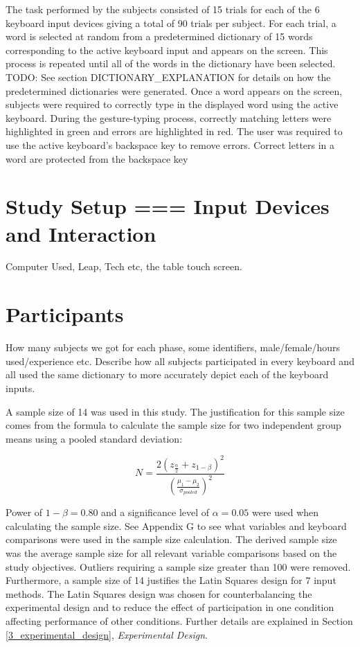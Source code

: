 The task performed by the subjects consisted of 15 trials for each of the 6 keyboard input devices giving a total of 90 trials per subject. For each trial, a word is selected at random from a predetermined dictionary of 15 words corresponding to the active keyboard input and appears on the screen. This process is repeated until all of the words in the dictionary have been selected. TODO: See section DICTIONARY_EXPLANATION for details on how the predetermined dictionaries were generated. Once a word appears on the screen, subjects were required to correctly type in the displayed word using the active keyboard. During the gesture-typing process, correctly matching letters were highlighted in green and errors are highlighted in red. The user was required to use the active keyboard's backspace key to remove errors. Correct letters in a word are protected from the backspace key 

\section{Study Setup === Input Devices and Interaction}

Computer Used, Leap, Tech etc, the table touch screen.

\section{Participants}

How many subjects we got for each phase, some identifiers, male/female/hours used/experience etc. Describe how all subjects participated in every keyboard and all used the same dictionary to more accurately depict each of the keyboard inputs.

A sample size of 14 was used in this study. The justification for this sample size comes from the formula to calculate the sample size for two independent group means using a pooled standard deviation:

\begin{equation}
 N = \frac{2(z_{\frac{\alpha}{2}} + z_{1-\beta})^2}{(\frac{\mu_1 - \mu_2}{\sigma_{pooled}})^2}
\end{equation}

Power of $1-\beta = 0.80$ and a significance level of $\alpha = 0.05$ were used when calculating the sample size. See Appendix G to see what variables and keyboard comparisons were used in the sample size calculation. The derived sample size was the average sample size for all relevant variable comparisons based on the study objectives. Outliers requiring a sample size greater than 100 were removed. Furthermore, a sample size of 14 justifies the Latin Squares design for 7 input methods. The Latin Squares design was chosen for counterbalancing the experimental design and to reduce the effect of participation in one condition affecting performance of other conditions. Further details are explained in Section \ref{3_experimental_design}, \textit{Experimental Design}.


